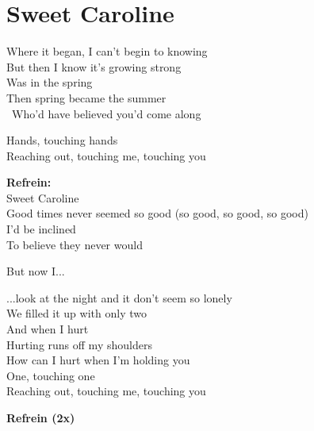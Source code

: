 \section{Sweet Caroline}
Where it began, I can't begin to knowing\\
But then I know it's growing strong\\
Was in the spring\\
Then spring became the summer\\\
Who'd have believed you'd come along

Hands, touching hands\\
Reaching out, touching me, touching you

\textbf{Refrein:}\\
Sweet Caroline\\
Good times never seemed so good (so good, so good, so good)\\
I'd be inclined\\
To believe they never would

But now I...

...look at the night and it don't seem so lonely\\
We filled it up with only two\\
And when I hurt\\
Hurting runs off my shoulders\\
How can I hurt when I'm holding you\\

One, touching one\\
Reaching out, touching me, touching you

\textbf{Refrein (2x)}